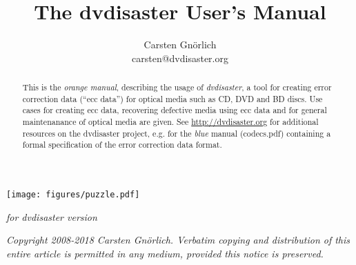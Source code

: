 \documentclass[12pt,a4paper,twoside]{article}
\newcommand{\paperversion}{{\em for dvdisaster version \projectversion}}
\begin{document}
\pagecolor{lightorange}
\title{The dvdisaster User's Manual}
\author{Carsten Gnörlich\\carsten@dvdisaster.org}
\date{}
\maketitle
\thispagestyle{empty}

\centerline{\texttt{[image: figures/puzzle.pdf]}}

\begin{center}
\paperversion
\end{center}

\bigskip

\begin{abstract}
This is the {\em orange manual}, describing the usage of {\em dvdisaster}, a tool for
creating error correction data (``ecc data'') 
for optical media  such as CD, DVD and BD discs. 
Use cases for creating ecc data, recovering defective media
using ecc data and for general maintenanance of optical 
media are given. 
See \url{http://dvdisaster.org}  for additional resources on
the dvdisaster project, e.g. for the {\em blue} manual (codecs.pdf)
containing a formal specification of the error correction data format.
\end{abstract}

\vfill
\begin{center}
{\em 
Copyright 2008-2018 Carsten Gnörlich.
Verbatim copying and distribution of this entire article is permitted in any medium, 
provided this notice is preserved.}
\end{center}

\newpage
\nopagecolor


\tableofcontents
\newpage


\newpage


\newpage


\newpage


\newpage


\newpage


\newpage


\newpage



\label{LastPage}\label{missing}
\end{document}
